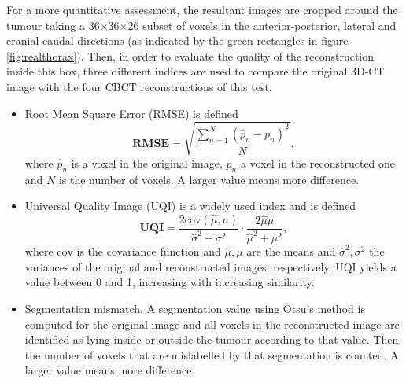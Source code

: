 For a more quantitative assessment, the resultant images are cropped around the tumour taking a 36$\times$36$\times$26 subset of voxels in the anterior-posterior, lateral and cranial-caudal directions (as indicated by the green rectangles in figure \ref{fig:realthorax}).  Then, in order to evaluate the quality of the reconstruction inside this box, three different indices are used to compare the original 3D-CT image with the four CBCT reconstructions of this test.

\begin{itemize}

\item Root Mean Square Error (RMSE) is defined
\begin{equation}
\boldsymbol{\textrm{RMSE}}=\sqrt{\frac{\sum_{n=1}^N(\hat{p}_n-p_n)^2}{N}},
\end{equation}
where $\hat{p}_n$ is a voxel in the original image, $p_n$ a voxel in the reconstructed one and $N$ is the number of voxels.  A larger value means more difference.

\item Universal Quality Image (UQI)\cite{wang2002universal} is a widely used index and is defined
\begin{equation}
\boldsymbol{\textrm{UQI}}=\frac{2\textrm{cov}(\hat{\mu},\mu)}{\hat{\sigma}^2+\sigma^2}\cdot \frac{2\hat{\mu}\mu}{\hat{\mu}^2+\mu^2},
\end{equation}
where $\textrm{cov}$ is the covariance function and $\hat{\mu},\mu$ are the means and $\hat{\sigma}^2,\sigma^2$ the variances of the original and reconstructed images, respectively.  UQI yields a value between 0 and 1, increasing with increasing similarity.

\item Segmentation mismatch.  A segmentation value using Otsu's method\cite{otsu1975threshold} is computed for the original image and all voxels in the reconstructed image are identified as lying inside or outside the tumour according to that value.  Then the number of voxels that are mislabelled by that segmentation is counted.  A larger value means more difference.

\end{itemize}

